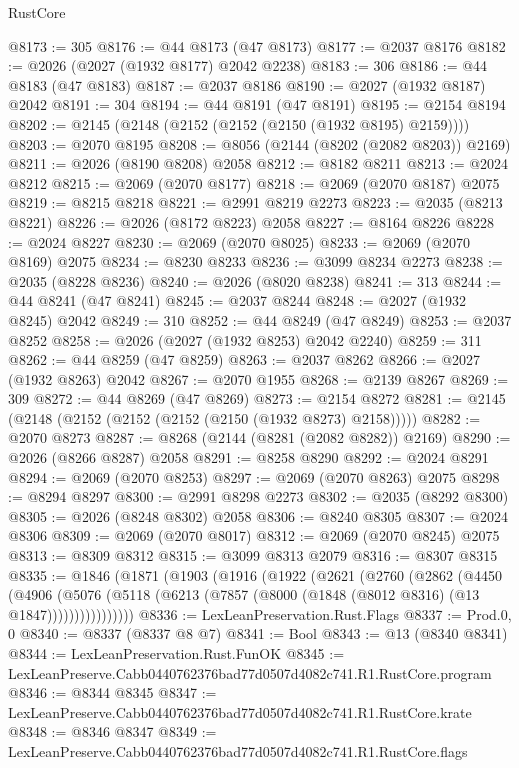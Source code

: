 \begin{lexlean}{RustCore}
\begin{coremodule}
@8173 := 305
@8176 := @44 @8173 (@47 @8173)
@8177 := @2037 @8176
@8182 := @2026 (@2027 (@1932 @8177) @2042 @2238)
@8183 := 306
@8186 := @44 @8183 (@47 @8183)
@8187 := @2037 @8186
@8190 := @2027 (@1932 @8187) @2042
@8191 := 304
@8194 := @44 @8191 (@47 @8191)
@8195 := @2154 @8194
@8202 := @2145 (@2148 (@2152 (@2152 (@2150 (@1932 @8195) @2159))))
@8203 := @2070 @8195
@8208 := @8056 (@2144 (@8202 (@2082 @8203)) @2169)
@8211 := @2026 (@8190 @8208) @2058
@8212 := @8182 @8211
@8213 := @2024 @8212
@8215 := @2069 (@2070 @8177)
@8218 := @2069 (@2070 @8187) @2075
@8219 := @8215 @8218
@8221 := @2991 @8219 @2273
@8223 := @2035 (@8213 @8221)
@8226 := @2026 (@8172 @8223) @2058
@8227 := @8164 @8226
@8228 := @2024 @8227
@8230 := @2069 (@2070 @8025)
@8233 := @2069 (@2070 @8169) @2075
@8234 := @8230 @8233
@8236 := @3099 @8234 @2273
@8238 := @2035 (@8228 @8236)
@8240 := @2026 (@8020 @8238)
@8241 := 313
@8244 := @44 @8241 (@47 @8241)
@8245 := @2037 @8244
@8248 := @2027 (@1932 @8245) @2042
@8249 := 310
@8252 := @44 @8249 (@47 @8249)
@8253 := @2037 @8252
@8258 := @2026 (@2027 (@1932 @8253) @2042 @2240)
@8259 := 311
@8262 := @44 @8259 (@47 @8259)
@8263 := @2037 @8262
@8266 := @2027 (@1932 @8263) @2042
@8267 := @2070 @1955
@8268 := @2139 @8267
@8269 := 309
@8272 := @44 @8269 (@47 @8269)
@8273 := @2154 @8272
@8281 := @2145 (@2148 (@2152 (@2152 (@2152 (@2150 (@1932 @8273) @2158)))))
@8282 := @2070 @8273
@8287 := @8268 (@2144 (@8281 (@2082 @8282)) @2169)
@8290 := @2026 (@8266 @8287) @2058
@8291 := @8258 @8290
@8292 := @2024 @8291
@8294 := @2069 (@2070 @8253)
@8297 := @2069 (@2070 @8263) @2075
@8298 := @8294 @8297
@8300 := @2991 @8298 @2273
@8302 := @2035 (@8292 @8300)
@8305 := @2026 (@8248 @8302) @2058
@8306 := @8240 @8305
@8307 := @2024 @8306
@8309 := @2069 (@2070 @8017)
@8312 := @2069 (@2070 @8245) @2075
@8313 := @8309 @8312
@8315 := @3099 @8313 @2079
@8316 := @8307 @8315
@8335 := @1846
    (@1871
      (@1903
        (@1916
          (@1922
            (@2621
              (@2760
                (@2862
                  (@4450
                    (@4906
                      (@5076
                        (@5118 (@6213 (@7857 (@8000 (@1848 (@8012 @8316) (@13 @1847))))))))))))))))
@8336 := LexLeanPreservation.Rust.Flags
@8337 := Prod.{0, 0}
@8340 := @8337 (@8337 @8 @7)
@8341 := Bool
@8343 := @13 (@8340 @8341)
@8344 := LexLeanPreservation.Rust.FunOK
@8345 := LexLeanPreserve.Cabb0440762376bad77d0507d4082c741.R1.RustCore.program
@8346 := @8344 @8345
@8347 := LexLeanPreserve.Cabb0440762376bad77d0507d4082c741.R1.RustCore.krate
@8348 := @8346 @8347
@8349 := LexLeanPreserve.Cabb0440762376bad77d0507d4082c741.R1.RustCore.flags

\end{coremodule}
\end{lexlean}
